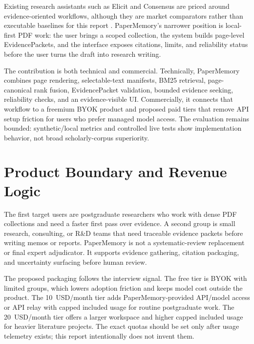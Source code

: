 Existing research assistants such as Elicit and Consensus are priced around evidence-oriented workflows, although they are market comparators rather than executable baselines for this report \citep{elicitPricing,consensusPricing}. PaperMemory's narrower position is local-first PDF work: the user brings a scoped collection, the system builds page-level EvidencePackets, and the interface exposes citations, limits, and reliability status before the user turns the draft into research writing.



The contribution is both technical and commercial. Technically, PaperMemory combines page rendering, selectable-text manifests, BM25 retrieval, page-canonical rank fusion, EvidencePacket validation, bounded evidence seeking, reliability checks, and an evidence-visible UI. Commercially, it connects that workflow to a freemium BYOK product and proposed paid tiers that remove API setup friction for users who prefer managed model access. The evaluation remains bounded: synthetic/local metrics and controlled live tests show implementation behavior, not broad scholarly-corpus superiority.

\section{Product Boundary and Revenue Logic}

The first target users are postgraduate researchers who work with dense PDF collections and need a faster first pass over evidence. A second group is small research, consulting, or R\&D teams that need traceable evidence packets before writing memos or reports. PaperMemory is not a systematic-review replacement or final expert adjudicator. It supports evidence gathering, citation packaging, and uncertainty surfacing before human review.

The proposed packaging follows the interview signal. The free tier is BYOK with limited groups, which lowers adoption friction and keeps model cost outside the product. The 10~USD/month tier adds PaperMemory-provided API/model access or API relay with capped included usage for routine postgraduate work. The 20~USD/month tier offers a larger workspace and higher capped included usage for heavier literature projects. The exact quotas should be set only after usage telemetry exists; this report intentionally does not invent them.



